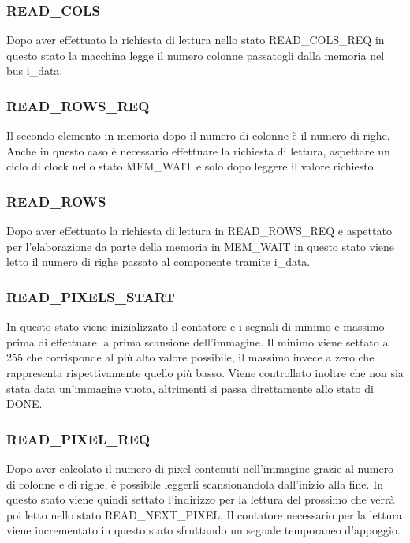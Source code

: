 \documentclass{article}
\begin{document}
\subsubsection{READ\_COLS}
Dopo aver effettuato la richiesta di lettura nello stato READ\_COLS\_REQ in questo stato la macchina legge il numero colonne passatogli dalla memoria nel bus i\_data.

\subsubsection{READ\_ROWS\_REQ}
Il secondo elemento in memoria dopo il numero di colonne è il numero di righe. Anche in questo caso è necessario effettuare la richiesta di lettura, aspettare un ciclo di clock nello stato MEM\_WAIT e solo dopo leggere il valore richiesto.

\subsubsection{READ\_ROWS}
Dopo aver effettuato la richiesta di lettura in READ\_ROWS\_REQ e aspettato per l'elaborazione da parte della memoria in MEM\_WAIT in questo stato viene letto il numero di righe passato al componente tramite i\_data.

\subsubsection{READ\_PIXELS\_START}
In questo stato viene inizializzato il contatore  e i segnali di minimo e massimo prima di effettuare la prima scansione dell'immagine. Il minimo viene settato a 255 che corrisponde al più alto valore possibile, il massimo invece a zero che rappresenta rispettivamente quello più basso. Viene controllato inoltre che non sia stata data un'immagine vuota, altrimenti si passa direttamente allo stato di DONE.

\subsubsection{READ\_PIXEL\_REQ}
Dopo aver calcolato il numero di pixel contenuti nell'immagine grazie al numero di colonne e di righe, è possibile leggerli scansionandola dall'inizio alla fine. In questo stato viene quindi settato l'indirizzo per la lettura del prossimo che verrà poi letto nello stato READ\_NEXT\_PIXEL. Il contatore necessario per la lettura viene incrementato in questo stato sfruttando un segnale temporaneo d'appoggio.
\end{document}

